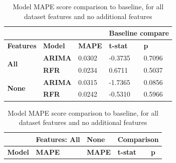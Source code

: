 \begin{table}[h]
\hspace*{\fill}
\parbox{.45\columnwidth}{
\centering
\begin{tabular}{lllll|}
\cline{4-5}
\multicolumn{3}{l|}{}                                                                                                                        & \multicolumn{2}{l|}{\textbf{Baseline compare}} \\ \hline
\multicolumn{1}{|l|}{\textbf{Features}}                    & \multicolumn{1}{l|}{\textbf{Model}} & \multicolumn{1}{l|}{\textbf{MAPE}} & \multicolumn{1}{l|}{\textbf{t-stat}}  & \textbf{p} \\ \hline
\multicolumn{1}{|l|}{\multirow{2}{*}{\textbf{All}}} & \multicolumn{1}{|l|}{\textbf{ARIMA}}                      & 0.0302                                  & -0.3735                               & 0.7096     \\ \cline{2-5} 
\multicolumn{1}{|l|}{}                                       & \multicolumn{1}{|l|}{\textbf{RFR}}                        & 0.0234                                  & 0.6711                                & 0.5037     \\ \hline
\multicolumn{1}{|l|}{\multirow{2}{*}{\textbf{None}}}  & \multicolumn{1}{|l|}{\textbf{ARIMA}}                      & 0.0315                                  & -1.7365                               & 0.0856     \\ \cline{2-5} 
\multicolumn{1}{|l|}{}                                       & \multicolumn{1}{|l|}{\textbf{RFR}}                        & 0.0242                                  & -0.5310                               & 0.5966     \\ \hline
\end{tabular}
\caption{Model MAPE score comparison to baseline, for all dataset features and no additional features}
\label{tbl:modelscores}
}
\hfill
\parbox{.45\columnwidth}{
\centering
\begin{tabular}{l|llll|}
\cline{2-5}
                                        & \multicolumn{1}{l|}{\textbf{Features: All}} & \multicolumn{1}{l|}{\textbf{None}} & \multicolumn{2}{l|}{\textbf{Comparison}}          \\ \hline
\multicolumn{1}{|l|}{\textbf{Model}}    & \multicolumn{1}{l|}{\textbf{MAPE}}    & \multicolumn{1}{l|}{\textbf{MAPE}}   & \multicolumn{1}{l|}{\textbf{t-stat}} & \textbf{p} \\ \hline

\end{tabular}}
\end{table}
